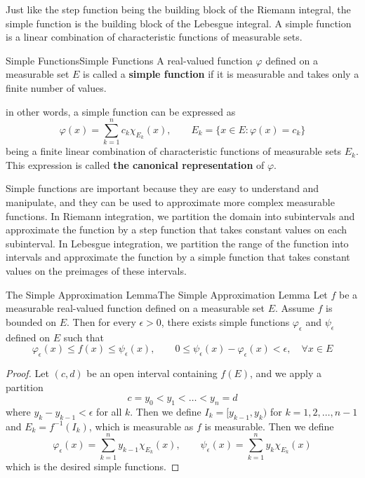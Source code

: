 \documentclass[../main.tex]{subfiles}
\begin{document}
Just like the step function being the building block of the Riemann integral, the simple function is the building block of the Lebesgue integral. A simple function is a linear combination of characteristic functions of measurable sets.

\begin{definition}{Simple Functions}{Simple Functions}
	A real-valued function $\varphi$ defined on a measurable set $E$ is called a \textbf{simple function} if it is measurable and takes only a finite number of values.
\end{definition}
in other words, a simple function can be expressed as
\begin{equation}
	\varphi(x) = \sum_{k=1}^{n} c_k \chi_{E_k}(x), \qquad E_k = \{x \in E : \varphi(x) = c_k\}
\end{equation}
being a finite linear combination of characteristic functions of measurable sets $E_k$. This expression is called \textbf{the canonical representation} of $\varphi$.

Simple functions are important because they are easy to understand and manipulate, and they can be used to approximate more complex measurable functions. In Riemann integration, we partition the domain into subintervals and approximate the function by a step function that takes constant values on each subinterval. In Lebesgue integration, we partition the range of the function into intervals and approximate the function by a simple function that takes constant values on the preimages of these intervals.

\begin{lemma}{The Simple Approximation Lemma}{The Simple Approximation Lemma}
	Let $f$ be a measurable real-valued function defined on a measurable set $E$. Assume $f$ is bounded on $E$. Then for every $\epsilon > 0$, there exists simple functions $\varphi_\epsilon$ and $\psi_\epsilon$ defined on $E$ such that
	\begin{equation}
		\varphi_\epsilon(x) \leq f(x) \leq \psi_\epsilon(x), \qquad 0 \leq \psi_\epsilon(x) - \varphi_\epsilon(x) < \epsilon, \quad \forall x \in E
	\end{equation}
\end{lemma}
\begin{proof}
	Let $(c,d)$ be an open interval containing $f(E)$, and we apply a partition
	\begin{equation*}
		c = y_0 < y_1 < \ldots < y_n = d
	\end{equation*}
	where $y_k - y_{k-1} < \epsilon$ for all $k$. Then we define $I_k = [y_{k-1}, y_k)$ for $k = 1, 2, \ldots, n-1$ and $E_k = f^{-1}(I_k)$, which is measurable as $f$ is measurable. Then we define
	\begin{equation}
		\varphi_\epsilon(x) = \sum_{k=1}^{n} y_{k-1} \chi_{E_k}(x), \qquad \psi_\epsilon(x) = \sum_{k=1}^{n} y_k \chi_{E_k}(x)
	\end{equation}
	which is the desired simple functions.
\end{proof}
\end{document}
